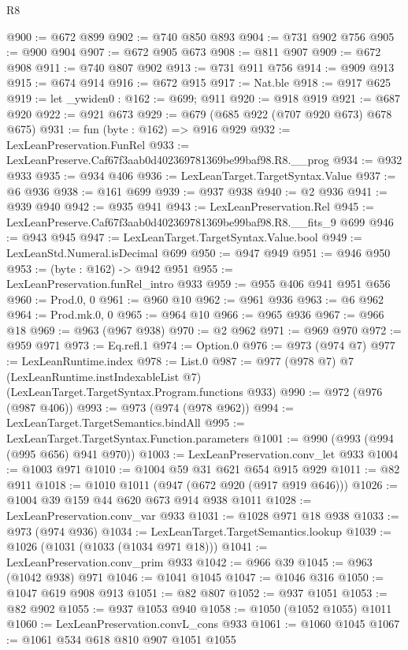 \begin{lexlean}{R8}
\begin{coremodule}
@900 := @672 @899
@902 := @740 @850 @893
@904 := @731 @902 @756
@905 := @900 @904
@907 := @672 @905 @673
@908 := @811 @907
@909 := @672 @908
@911 := @740 @807 @902
@913 := @731 @911 @756
@914 := @909 @913
@915 := @674 @914
@916 := @672 @915
@917 := Nat.ble
@918 := @917 @625
@919 := let _ywiden0 : @162 := @699; @911
@920 := @918 @919
@921 := @687 @920
@922 := @921 @673
@929 := @679 (@685 @922 (@707 @920 @673) @678 @675)
@931 := fun (byte : @162) => @916 @929
@932 := LexLeanPreservation.FunRel
@933 := LexLeanPreserve.Caf67f3aab0d402369781369be99baf98.R8.__prog
@934 := @932 @933
@935 := @934 @406
@936 := LexLeanTarget.TargetSyntax.Value
@937 := @6 @936
@938 := @161 @699
@939 := @937 @938
@940 := @2 @936
@941 := @939 @940
@942 := @935 @941
@943 := LexLeanPreservation.Rel
@945 := LexLeanPreserve.Caf67f3aab0d402369781369be99baf98.R8.__fits_9 @699
@946 := @943 @945
@947 := LexLeanTarget.TargetSyntax.Value.bool
@949 := LexLeanStd.Numeral.isDecimal @699
@950 := @947 @949
@951 := @946 @950
@953 := (byte : @162) -> @942 @951
@955 := LexLeanPreservation.funRel_intro @933
@959 := @955 @406 @941 @951 @656
@960 := Prod.{0, 0}
@961 := @960 @10
@962 := @961 @936
@963 := @6 @962
@964 := Prod.mk.{0, 0}
@965 := @964 @10
@966 := @965 @936
@967 := @966 @18
@969 := @963 (@967 @938)
@970 := @2 @962
@971 := @969 @970
@972 := @959 @971
@973 := Eq.refl.{1}
@974 := Option.{0}
@976 := @973 (@974 @7)
@977 := LexLeanRuntime.index
@978 := List.{0}
@987 := @977
    (@978 @7)
    @7
    (LexLeanRuntime.instIndexableList @7)
    (LexLeanTarget.TargetSyntax.Program.functions @933)
@990 := @972 (@976 (@987 @406))
@993 := @973 (@974 (@978 @962))
@994 := LexLeanTarget.TargetSemantics.bindAll
@995 := LexLeanTarget.TargetSyntax.Function.parameters
@1001 := @990 (@993 (@994 (@995 @656) @941 @970))
@1003 := LexLeanPreservation.conv_let @933
@1004 := @1003 @971
@1010 := @1004 @59 @31 @621 @654 @915 @929
@1011 := @82 @911
@1018 := @1010 @1011 (@947 (@672 @920 (@917 @919 @646)))
@1026 := @1004 @39 @159 @44 @620 @673 @914 @938 @1011
@1028 := LexLeanPreservation.conv_var @933
@1031 := @1028 @971 @18 @938
@1033 := @973 (@974 @936)
@1034 := LexLeanTarget.TargetSemantics.lookup
@1039 := @1026 (@1031 (@1033 (@1034 @971 @18)))
@1041 := LexLeanPreservation.conv_prim @933
@1042 := @966 @39
@1045 := @963 (@1042 @938) @971
@1046 := @1041 @1045
@1047 := @1046 @316
@1050 := @1047 @619 @908 @913
@1051 := @82 @807
@1052 := @937 @1051
@1053 := @82 @902
@1055 := @937 @1053 @940
@1058 := @1050 (@1052 @1055) @1011
@1060 := LexLeanPreservation.convL_cons @933
@1061 := @1060 @1045
@1067 := @1061 @534 @618 @810 @907 @1051 @1055

\end{coremodule}
\end{lexlean}
